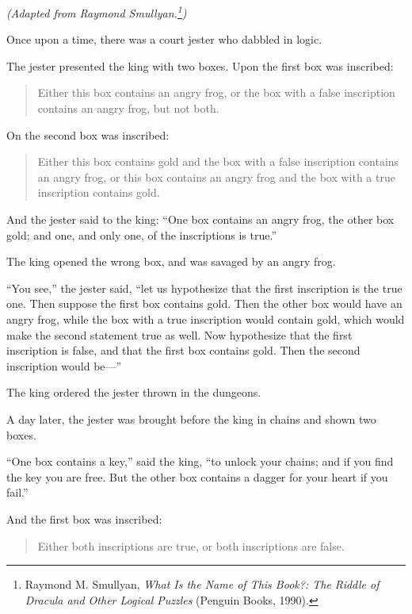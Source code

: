 
{
 \textit{(Adapted from Raymond
Smullyan.}\textit{\footnote{Raymond M. Smullyan, \textit{What Is the Name of This Book?:
The Riddle of Dracula and Other Logical Puzzles} (Penguin Books,
1990).}}\textit{)} }

{
 Once upon a time, there was a court jester who dabbled in logic.}

{
 The jester presented the king with two boxes. Upon the first box
was inscribed:}

\begin{quote}
{
 Either this box contains an angry frog, or the box with a false
 inscription contains an angry frog, but not both.}
\end{quote}

{
 On the second box was inscribed:}

\begin{quote}
{
 Either this box contains gold and the box with a false inscription
contains an angry frog, or this box contains an angry frog and the box
with a true inscription contains gold.}
\end{quote}

{
 And the jester said to the king: ``One box
contains an angry frog, the other box gold; and one, and only one, of
the inscriptions is true.''}

{
 The king opened the wrong box, and was savaged by an angry frog.}

{
 ``You see,'' the jester said,
``let us hypothesize that the first inscription is the
true one. Then suppose the first box contains gold. Then the other box
would have an angry frog, while the box with a true inscription would
contain gold, which would make the second statement true as well. Now
hypothesize that the first inscription is false, and that the first box
contains gold. Then the second inscription would
be---''}

{
 The king ordered the jester thrown in the dungeons.}

{
 A day later, the jester was brought before the king in chains and
shown two boxes.}

{
 ``One box contains a key,''
said the king, ``to unlock your chains; and if you
find the key you are free. But the other box contains a dagger for your
heart if you fail.''}

{
 And the first box was inscribed:}

\begin{quote}
{
 Either both inscriptions are true, or both inscriptions are
 false.}
\end{quote}

